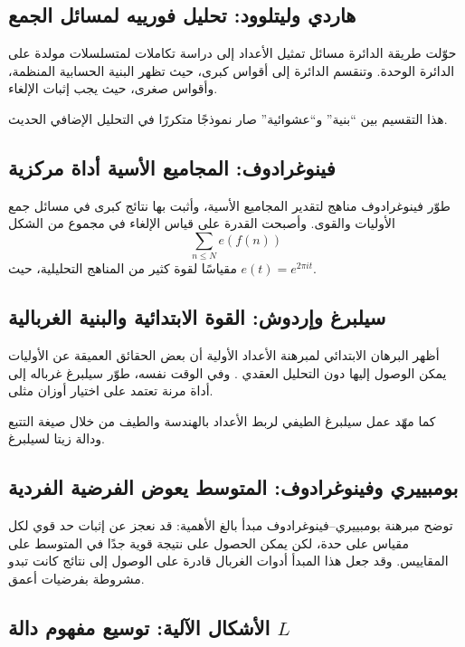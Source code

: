 \subsection{هاردي وليتلوود: تحليل فورييه لمسائل الجمع}

حوّلت طريقة الدائرة مسائل تمثيل الأعداد إلى دراسة تكاملات لمتسلسلات مولدة على الدائرة الوحدة. وتنقسم الدائرة إلى أقواس كبرى، حيث تظهر البنية الحسابية المنظمة، وأقواس صغرى، حيث يجب إثبات الإلغاء.

هذا التقسيم بين ``بنية'' و``عشوائية'' صار نموذجًا متكررًا في التحليل الإضافي الحديث.

\subsection{فينوغرادوف: المجاميع الأسية أداة مركزية}

طوّر فينوغرادوف مناهج لتقدير المجاميع الأسية، وأثبت بها نتائج كبرى في مسائل جمع الأوليات والقوى. وأصبحت القدرة على قياس الإلغاء في مجموع من الشكل
\[
\sum_{n\leq N} e(f(n))
\]
مقياسًا لقوة كثير من المناهج التحليلية، حيث \(e(t)=e^{2\pi i t}\).

\subsection{سيلبرغ وإردوش: القوة الابتدائية والبنية الغربالية}

أظهر البرهان الابتدائي لمبرهنة الأعداد الأولية أن بعض الحقائق العميقة عن
الأوليات يمكن الوصول إليها دون التحليل العقدي
\cite{BaasSkau2008,Newman1980}. وفي الوقت نفسه، طوّر سيلبرغ غرباله إلى أداة مرنة تعتمد على اختيار أوزان مثلى.

كما مهّد عمل سيلبرغ الطيفي لربط الأعداد بالهندسة والطيف من خلال صيغة التتبع ودالة زيتا لسيلبرغ.

\subsection{بومبييري وفينوغرادوف: المتوسط يعوض الفرضية الفردية}

توضح مبرهنة بومبييري--فينوغرادوف مبدأ بالغ الأهمية: قد نعجز عن إثبات حد قوي لكل مقياس على حدة، لكن يمكن الحصول على نتيجة قوية جدًا في المتوسط على المقاييس. وقد جعل هذا المبدأ أدوات الغربال قادرة على الوصول إلى نتائج كانت تبدو مشروطة بفرضيات أعمق.

\subsection{الأشكال الآلية: توسيع مفهوم دالة \(L\)}

